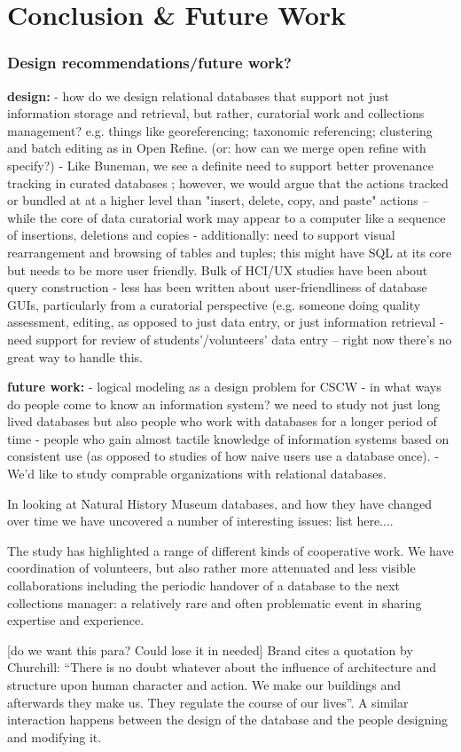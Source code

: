 \section{Conclusion & Future Work}


\subsubsection{Design recommendations/future work?}

\textbf{design: }
- how do we design relational databases that support not just information storage and retrieval, but rather,  curatorial work and collections management? e.g. things like georeferencing; taxonomic referencing; clustering and batch editing as in Open Refine. (or: how can we merge open refine with specify?)
- Like Buneman, we see a definite need to support better provenance tracking in curated databases \cite{Buneman_2006}; however, we would argue that the actions tracked or bundled at at a higher level than "insert, delete, copy, and paste" actions -- while the core of data curatorial work may appear to a computer like a sequence of insertions, deletions and copies
- additionally: need to support visual rearrangement and browsing of tables and tuples; this might have SQL at its core but needs to be more user friendly. Bulk of HCI/UX studies have been about query construction - less has been written about user-friendliness of database GUIs, particularly from a curatorial perspective (e.g. someone doing quality assessment, editing, as opposed to just data entry, or just information retrieval
- need support for review of students'/volunteers' data entry  -- right now there's no great way to handle this.

\textbf{future work:}
- logical modeling as a design problem for CSCW
- in what ways do people come to know an information system? we need to study not just long lived databases but also people who work with databases for a longer period of time - people who gain almost tactile knowledge of information systems based on consistent use (as opposed to studies of how naive users use a database once).
- We'd like to study comprable organizations with relational databases.

In looking at Natural History Museum databases, and how they have changed over time we have uncovered a number of interesting issues:
list here....

The study has highlighted a range of different kinds of cooperative work. We have  coordination of volunteers, but also rather more attenuated and less visible collaborations including the periodic handover of a database to the next collections manager: a relatively rare and often problematic event in sharing expertise and experience. 

[do we want this para? Could lose it in needed] Brand cites a quotation by Churchill: “There is no doubt whatever about the influence of architecture and structure upon human character and action. We make our buildings and afterwards they make us. They regulate the course of our lives”. A similar interaction happens between the design of the database and the people designing and modifying it.